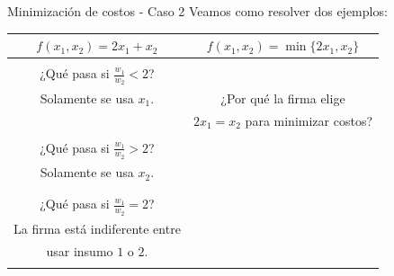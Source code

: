 \documentclass{beamer}
\theoremstyle{definition}
\begin{document}
	
	\begin{frame}{Minimización de costos - Caso 2}
	Veamos como resolver dos ejemplos:
\begin{center}
\begin{tabular}{c|c}
\hline
   $f(x_1,x_2)=2x_1+x_2$  &  $f(x_1,x_2)=\min \{2x_1,x_2\}$  \\
   \hline
     & \\
 \color{gray} ¿Qué pasa si $\frac{w_1}{w_2}<2$?     & \\
  \color{gray}Solamente se usa $x_1$.   & \color{gray} ¿Por qué la firma elige\\ 
     & \color{gray} $2x_1=x_2$ para minimizar costos?\\
     & \\
 \color{gray} ¿Qué pasa si $\frac{w_1}{w_2}>2$?      & \\
 \color{gray}Solamente se usa $x_2$.     & \\
     & \\
    & \\
   \color{gray} ¿Qué pasa si $\frac{w_1}{w_2}=2$?    & \\
  \color{gray} La firma está indiferente entre   & \\
  \color{gray} usar insumo $1$ o $2$.    & \\
     & \\
\end{tabular}
   \end{center}
    
\end{frame}	
\end{document}
